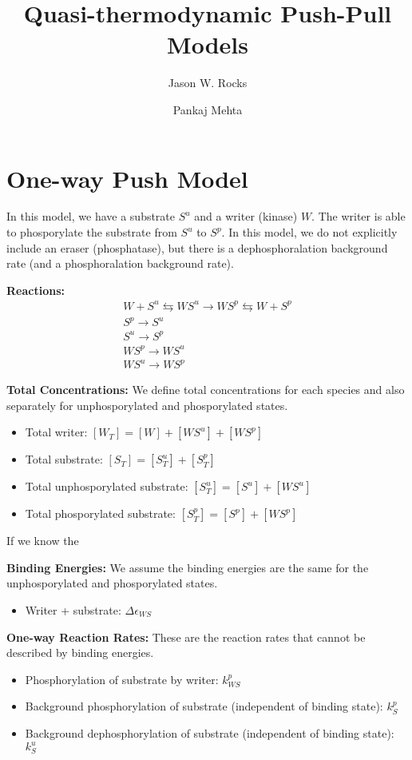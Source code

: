 \documentclass[aps,onecolumn,superscriptaddress,notitlepage]{revtex4-1}
\begin{document}
\title{Quasi-thermodynamic Push-Pull Models}
\author{Jason W. Rocks}
\author{Pankaj Mehta}
\maketitle


\section{One-way Push Model}


In this model, we have a substrate $S^u$ and a writer (kinase) $W$. 
The writer is able to phosporylate the substrate from $S^u$ to $S^p$.
In this model, we do not explicitly include an eraser (phosphatase), 
but there is a dephosphoralation background rate (and a phosphoralation background rate).

\textbf{Reactions:}
\begin{gather}
W + S^u \leftrightarrows WS^u \rightarrow WS^p \leftrightarrows W + S^p\\
S^p \rightarrow S^u\\
S^u \rightarrow S^p\\
WS^p \rightarrow WS^u\\
WS^u \rightarrow WS^p
\end{gather}


\textbf{Total Concentrations:}
We define total concentrations for each species and also separately for unphosporylated and phosporylated states.
\begin{itemize}
\item Total writer: $[W_T] = [W] + [WS^u] + [WS^p]$
\item Total substrate: $[S_T] = [S^u_T] + [S^p_T]$
\item Total unphosporylated substrate: $[S^u_T] = [S^u] + [WS^u]$
\item Total phosporylated substrate: $[S^p_T] = [S^p] + [WS^p]$
\end{itemize}
If we know the 

\textbf{Binding Energies:}
We assume the binding energies are the same for the unphosporylated and phosporylated states.
\begin{itemize}
\item Writer + substrate: $\Delta\epsilon_{WS}$
\end{itemize}

\textbf{One-way Reaction Rates:}
These are the reaction rates that cannot be described by binding energies.
\begin{itemize}
\item Phosphorylation of substrate by writer: $k_{WS}^p$
\item Background phosphorylation of substrate (independent of binding state): $k_S^p$
\item Background dephosphorylation of substrate (independent of binding state): $k_S^u$
\end{itemize}
\end{document}
